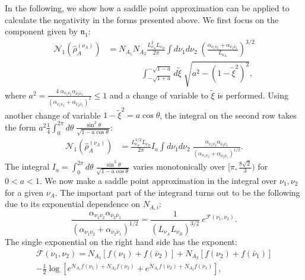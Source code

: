 \documentclass[aps,pra,reprint,superscriptaddress,twocolumn,notitlepage]{revtex4-1}
\numberwithin{equation}{section}
\begin{document}
In the following, we show how a saddle point approximation can be applied to calculate the negativity in the forms presented above. We first focus on the component given by $\mathfrak{n}_1$:
\begin{equation}
\begin{aligned}
    \mathcal{N}_1(\hat\rho_A^{(\nu_A)}) &=  N_{A_1} N_{A_2} \frac{L_{\nu_A}^2 L_{\nu_B} }{2\pi} \int d\nu_1 d\nu_2 \;  \left( \frac{  \alpha_{\nu_1 \nu_2} + \alpha_{\bar{\nu}_2 \bar{\nu}_1} }{L_{\nu_A}}   \right)^{3/2} \\
    & \qquad \qquad \int_{-\sqrt{1+a}}^{-\sqrt{1-a}} d\tilde{\xi} \; \sqrt{a^2 - \left( 1 -  \tilde{\xi}^2 \right)^2},
\end{aligned}    
\end{equation}
where $a^2 = \frac{4 \; \alpha_{\nu_1\nu_2} \alpha_{\bar{\nu}_2 \bar{\nu}_1}}{ \left( \alpha_{\nu_1\nu_2} + \alpha_{\bar{\nu}_2 \bar{\nu}_1} \right)^2 } \leq 1$ and a change of variable to $\tilde{\xi}$ is performed. Using another change of variable $1 -  \tilde{\xi}^2  = a \cos\theta$, the integral on the second row takes the form $a^2 \frac{1}{4} \int_0^{2\pi}d\theta \; \frac{\sin^2\theta}{\sqrt{1-a \cos\theta}}$: 
\begin{equation}\label{eq:int_to_be_saddle_point_approxed}
\begin{aligned}
    \mathcal{N}_1(\hat\rho_A^{(\nu_A)})
    &= \frac{  L_{\nu_A}^{1/2} L_{\nu_B} }{2\pi} I_a \int d\nu_1 d\nu_2 \;  \frac{ \alpha_{\nu_1\nu_2} \alpha_{\bar{\nu}_2 \bar{\nu}_1}}{ \left( \alpha_{\nu_1\nu_2} + \alpha_{\bar{\nu}_2 \bar{\nu}_1} \right)^{1/2} }. 
\end{aligned}    
\end{equation}
The integral $I_a=\int_0^{2\pi} d\theta \; \frac{\sin^2\theta}{\sqrt{1-a \cos\theta}}$ varies monotonically over $[\pi,\frac{8 \sqrt{2}}{3})$ for $0<a<1$.
We now make a saddle point approximation in the integral over $\nu_1, \nu_2$ for a given $\nu_A$. The important part of the integrand turns out to be the following due to its exponential dependence on $N_{A,i}$:
\begin{equation}
     \frac{ \alpha_{\nu_1\nu_2} \alpha_{\bar{\nu}_2 \bar{\nu}_1}}{ \left( \alpha_{\nu_1\nu_2} + \alpha_{\bar{\nu}_2 \bar{\nu}_1} \right)^{1/2} } 
     = \frac{1}{\left( L_{\nu_A} L_{\nu_B} \right)^{3/2}} \ e^{\mathcal{F}(\nu_1,\nu_2) }.
\end{equation}
The single exponential on the right hand side has the exponent:
\begin{equation}
\begin{aligned}
    \mathcal{F}(\nu_1,\nu_2) = N_{A_1} \left[  f(\nu_1) + f(\bar{\nu}_2) \right] + N_{A_2} \left[  f(\nu_2) + f(\bar{\nu}_1) \right] \\
     - \frac12 \log \left[  
     e^{N_{A_1} f(\nu_1) + N_{A_2} f(\nu_2)} + e^{N_{A_1} f(\bar{\nu}_2) + N_{A_2} f(\bar{\nu}_1)} 
     \right],
\end{aligned}
\end{equation}
\end{document}
